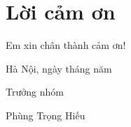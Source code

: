 \documentclass[12pt,a4paper,oneside]{book}
\newcommand{\teachername}{TS. Nguyễn Thị Ngọc Anh}
\begin{document}
\renewcommand{\listfigurename}{Danh mục hình vẽ}
\listoffigures

\chapter{Lời cảm ơn}





Em xin chân thành cảm ơn!

\hfill
\begin{minipage}[t]{0.48\textwidth}
	\begin{center}
		Hà Nội, ngày \the\day\space tháng \the\month\space năm \the\year\par
		Trưởng nhóm\par
		Phùng Trọng Hiếu
	\end{center}
\end{minipage}

\tableofcontents

\mainmatter













\backmatter

% 

\printbibliography[heading=bibintoc]
\end{document}
